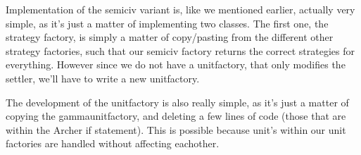 Implementation of the semiciv variant is, like we mentioned earlier, actually
very simple, as it's just a matter of implementing two classes. 
The first one, the strategy factory, is simply a matter of copy/pasting from the different
other strategy factories, such that our semiciv factory returns the correct
strategies for everything.
 However since we do not have a unitfactory, that only modifies the settler,
 we'll have to write a new unitfactory.

The development of the unitfactory is also really simple, as it's just a matter
of copying the gammaunitfactory, and deleting a few lines of code (those that
are within the Archer if statement). 
This is possible because unit's within our
unit factories are handled without affecting eachother.

